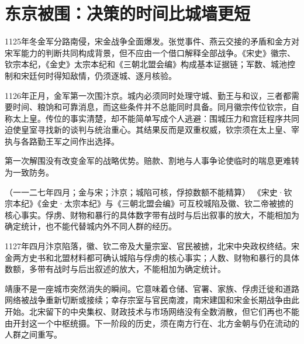 \section{东京被围：决策的时间比城墙更短}

1125年冬金军分路南侵，宋金战争全面爆发。张觉事件、燕云交接的矛盾和金方对宋军能力的判断共同构成背景，但不应由一个借口解释全部战争。《宋史》徽宗、钦宗本纪，《金史》太宗本纪和《三朝北盟会编》构成基本证据链；军数、城池控制和宋廷何时得知敌情，仍须逐城、逐月核验。

1126年正月，金军第一次围汴京。城内必须同时处理守城、勤王与和议，三者都需要时间、粮饷和可靠消息，而这些条件并不总能同时具备。同月徽宗传位钦宗，自称太上皇。传位的事实清楚，却不能简单写成个人逃避：围城压力和宫廷程序共同迫使皇室寻找新的谈判与统治重心。其结果反而是双重权威，钦宗须在太上皇、宰执与各路勤王军之间作出选择。

第一次解围没有改变金军的战略优势。赔款、割地与人事争论使临时的喘息更难转为一致防务。

\begin{event}{（一一二七年四月；金与宋；汴京；城陷可核，俘掠数额不能精算）}
《宋史·钦宗本纪》《金史·太宗本纪》与《三朝北盟会编》可互校城陷及徽、钦二帝被掳的核心事实。俘虏、财物和暴行的具体数字带有战时与后出叙事的放大，不能相加为确定统计，也不能代替城内外不同人群的经历。
\end{event}

1127年四月汴京陷落，徽、钦二帝及大量宗室、官民被掳，北宋中央政权终结。宋金两方史书和北盟材料都可确认城陷与俘虏的核心事实；人数、财物和暴行的具体数额，多带有战时与后出叙述的放大，不能相加为确定统计。

靖康不是一座城市突然消失的瞬间。它意味着仓储、官署、家族、俘虏迁徙和道路网络被战争重新切断或接续；幸存宗室与官民南渡，南宋建国和宋金长期战争由此开始。北宋留下的中央集权、财政技术与市场网络没有全数消散，但它们再也不能由开封这一个中枢统摄。下一阶段的历史，须在南方行在、北方金朝与仍在流动的人群之间重写。

